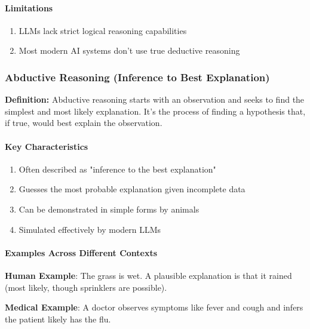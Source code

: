 \paragraph{Limitations}
\label{para:deductive-limitations}

\begin{enumerate}
\item LLMs lack strict logical reasoning capabilities
\item Most modern AI systems don't use true deductive reasoning
\end{enumerate}

\subsubsection{Abductive Reasoning (Inference to Best Explanation)}
\label{subsubsec:abductive-reasoning}

\textbf{Definition:} Abductive reasoning starts with an observation and seeks to find the simplest and most likely explanation. It's the process of finding a hypothesis that, if true, would best explain the observation.

\paragraph{Key Characteristics}
\label{para:abductive-characteristics}

\begin{enumerate}
\item Often described as "inference to the best explanation"
\item Guesses the most probable explanation given incomplete data
\item Can be demonstrated in simple forms by animals
\item Simulated effectively by modern LLMs
\end{enumerate}

\paragraph{Examples Across Different Contexts}
\label{para:abductive-examples}

\textbf{Human Example}: The grass is wet. A plausible explanation is that it rained (most likely, though sprinklers are possible).

\textbf{Medical Example}: A doctor observes symptoms like fever and cough and infers the patient likely has the flu.

